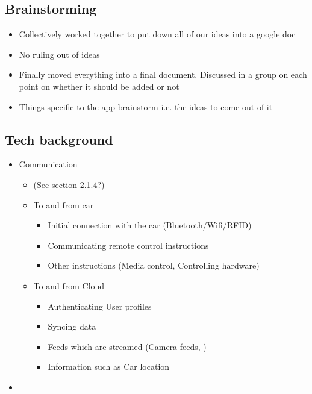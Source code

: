 \documentclass{article}
\begin{document}
\subsection{Brainstorming}
	\begin{itemize}
		\item Collectively worked together to put down all of our ideas into a google doc
		\item No ruling out of ideas
		\item Finally moved everything into a final document. Discussed in a group on each point on whether it should be added or not
        \item Things specific to the app brainstorm i.e. the ideas to come out of it
	\end{itemize}
\subsection{Tech background}
	\begin{itemize}
		\item Communication
        \begin{itemize}
        	\item (See section 2.1.4?)
        	\item To and from car
            \begin{itemize}
            	\item Initial connection with the car (Bluetooth/Wifi/RFID)
                \item Communicating remote control instructions
                \item Other instructions (Media control, Controlling hardware)
            \end{itemize}
            \item To and from Cloud
            \begin{itemize}
            	\item Authenticating User profiles
                \item Syncing data
                \item Feeds which are streamed (Camera feeds, )
                \item Information such as Car location
            \end{itemize}
        \end{itemize}
        \item 
	\end{itemize}
    
\end{document}
